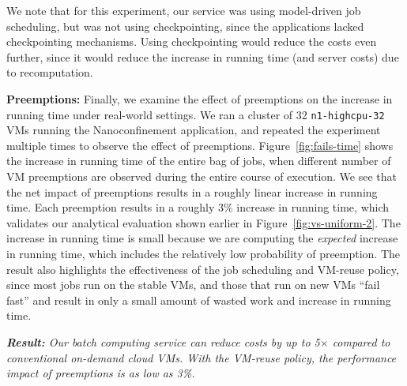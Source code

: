We note that for this experiment, our  service was using model-driven job scheduling, but was not using checkpointing, since the applications lacked checkpointing mechanisms.
Using checkpointing would reduce the costs even further, since it would reduce the increase in running time (and server costs) due to recomputation.


\noindent \textbf{Preemptions:} 
Finally, we examine the effect of preemptions on the increase in running time under real-world settings.
We ran a cluster of 32 \texttt{n1-highcpu-32} VMs running the Nanoconfinement application, and repeated the experiment multiple times to observe the effect of preemptions.
Figure~\ref{fig:fails-time} shows the increase in running time of the entire bag of jobs, when different number of VM preemptions are observed during the entire course of execution.
We see that the net impact of preemptions results in a roughly linear increase in running time. 
Each preemption results in a roughly 3\% increase in running time, which validates our analytical evaluation shown earlier in Figure~\ref{fig:vs-uniform-2}.
The increase in running time is small because we are computing the \emph{expected} increase in running time, which includes the relatively low probability of preemption. 
The result also highlights the effectiveness of the job scheduling and VM-reuse policy, since most jobs run on the stable VMs, and  those that run on new VMs ``fail fast'' and result in only a small amount of wasted work and increase in running time. 





\noindent \emph{\textbf{Result:} Our batch computing service can reduce costs by up to 5$\times$ compared to conventional on-demand cloud VMs. With the VM-reuse policy, the performance impact of preemptions is as low as 3\%.}








